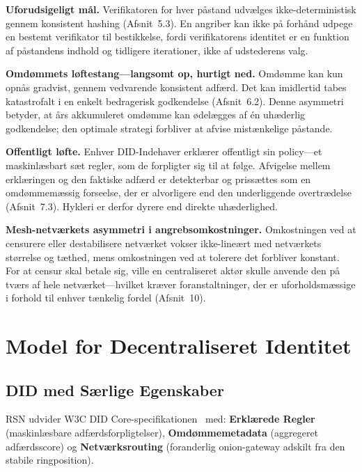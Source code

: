\documentclass[11pt,a4paper,twocolumn]{article}
\begin{document}
\textbf{Uforudsigeligt mål.} Verifikatoren for hver påstand udvælges ikke-deterministisk gennem konsistent hashing (Afsnit~5.3). En angriber kan ikke på forhånd udpege en bestemt verifikator til bestikkelse, fordi verifikatorens identitet er en funktion af påstandens indhold og tidligere iterationer, ikke af udstederens valg.

\textbf{Omdømmets løftestang---langsomt op, hurtigt ned.} Omdømme kan kun opnås gradvist, gennem vedvarende konsistent adfærd. Det kan imidlertid tabes katastrofalt i en enkelt bedragerisk godkendelse (Afsnit~6.2). Denne asymmetri betyder, at års akkumuleret omdømme kan ødelægges af én uhæderlig godkendelse; den optimale strategi forbliver at afvise mistænkelige påstande.

\textbf{Offentligt løfte.} Enhver DID-Indehaver erklærer offentligt sin policy---et maskinlæsbart sæt regler, som de forpligter sig til at følge. Afvigelse mellem erklæringen og den faktiske adfærd er detekterbar og prissættes som en omdømmemæssig forseelse, der er alvorligere end den underliggende overtrædelse (Afsnit~7.3). Hykleri er derfor dyrere end direkte uhæderlighed.

\textbf{Mesh-netværkets asymmetri i angrebsomkostninger.} Omkostningen ved at censurere eller destabilisere netværket vokser ikke-lineært med netværkets størrelse og tæthed, mens omkostningen ved at tolerere det forbliver konstant. For at censur skal betale sig, ville en centraliseret aktør skulle anvende den på tværs af hele netværket---hvilket kræver foranstaltninger, der er uforholdsmæssige i forhold til enhver tænkelig fordel (Afsnit~10).

\section{Model for Decentraliseret Identitet}

\subsection{DID med Særlige Egenskaber}

RSN udvider W3C DID Core-specifikationen~\cite{did2022} med: \textbf{Erklærede Regler} (maskinlæsbare adfærdsforpligtelser), \textbf{Omdømmemetadata} (aggregeret adfærdsscore) og \textbf{Netværksrouting} (foranderlig onion-gateway adskilt fra den stabile ringposition).
\end{document}
